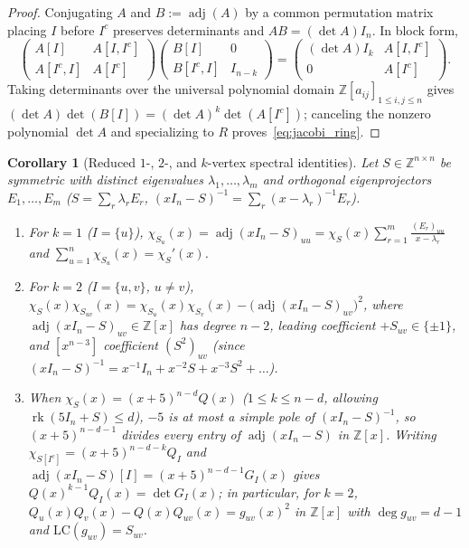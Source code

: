 \documentclass[11pt,reqno]{amsart}
\newtheorem{corollary}[theorem]{Corollary}
\theoremstyle{definition}
\theoremstyle{remark}
\numberwithin{equation}{section}
\numberwithin{table}{section}
\DeclareMathOperator{\rk}{rk}
\DeclareMathOperator{\adj}{adj}
\begin{document}
\begin{proof}
Conjugating $A$ and $B := \adj(A)$ by a common permutation matrix placing $I$ before $I^c$ preserves determinants and $AB = (\det A)I_n$. In block form,
\[
  \begin{pmatrix} A[I] & A[I, I^c] \\ A[I^c, I] & A[I^c] \end{pmatrix}
  \begin{pmatrix} B[I] & 0 \\ B[I^c, I] & I_{n-k} \end{pmatrix}
  = \begin{pmatrix} (\det A)I_k & A[I, I^c] \\ 0 & A[I^c] \end{pmatrix}.
\]
Taking determinants over the universal polynomial domain $\mathbb{Z}[a_{ij}]_{1 \le i,j \le n}$ gives $(\det A)\det(B[I]) = (\det A)^k \det(A[I^c])$; canceling the nonzero polynomial $\det A$ and specializing to $R$ proves~\eqref{eq:jacobi_ring}.
\end{proof}

\begin{corollary}[Reduced $1$-, $2$-, and $k$-vertex spectral identities]\label{cor:jacobi_seidel}
Let $S \in \mathbb{Z}^{n \times n}$ be symmetric with distinct eigenvalues $\lambda_1, \dots, \lambda_m$ and orthogonal eigenprojectors $E_1, \dots, E_m$ ($S = \sum_r \lambda_r E_r$, $(xI_n - S)^{-1} = \sum_r (x - \lambda_r)^{-1} E_r$).
\begin{enumerate}
  \item For $k = 1$ ($I = \{u\}$), $\chi_{S_u}(x) = \adj(xI_n - S)_{uu} = \chi_S(x)\sum_{r=1}^m \frac{(E_r)_{uu}}{x - \lambda_r}$ and $\sum_{u=1}^n \chi_{S_u}(x) = \chi_S'(x)$.
  \item For $k = 2$ ($I = \{u, v\}$, $u \neq v$), $\chi_S(x)\chi_{S_{uv}}(x) = \chi_{S_u}(x)\chi_{S_v}(x) - \big(\adj(xI_n - S)_{uv}\big)^2$, where $\adj(xI_n - S)_{uv} \in \mathbb{Z}[x]$ has degree $n - 2$, leading coefficient $+S_{uv} \in \{\pm 1\}$, and $[x^{n-3}]$ coefficient $(S^2)_{uv}$ (since $(xI_n - S)^{-1} = x^{-1}I_n + x^{-2}S + x^{-3}S^2 + \dots$).
  \item When $\chi_S(x) = (x+5)^{n-d} Q(x)$ ($1 \le k \le n - d$, allowing $\rk(5I_n + S) \le d$), $-5$ is at most a simple pole of $(xI_n - S)^{-1}$, so $(x+5)^{n-d-1}$ divides every entry of $\adj(xI_n - S)$ in $\mathbb{Z}[x]$. Writing $\chi_{S[I^c]} = (x+5)^{n-d-k} Q_I$ and $\adj(xI_n - S)[I] = (x+5)^{n-d-1} G_I(x)$ gives $Q(x)^{k-1} Q_I(x) = \det G_I(x)$; in particular, for $k = 2$, $Q_u(x)Q_v(x) - Q(x)Q_{uv}(x) = g_{uv}(x)^2$ in $\mathbb{Z}[x]$ with $\deg g_{uv} = d - 1$ and $\mathrm{LC}(g_{uv}) = S_{uv}$.
\end{enumerate}
\end{corollary}
\end{document}
